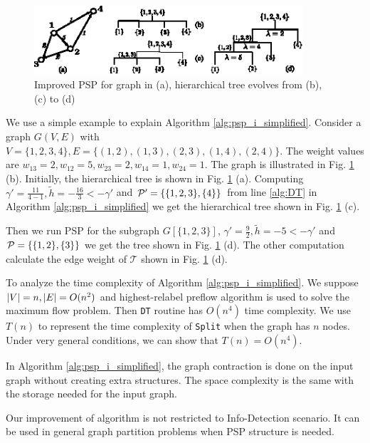 \documentclass[runningheads]{llncs}
\begin{document}
\begin{figure}[!ht]
	\centering
	\includegraphics[width=10cm]{pic/alg_illustration.eps}
	\caption{Improved PSP for graph in (a), hierarchical tree evolves from (b), (c) to (d) }\label{fig:alg_eg}
\end{figure}

\begin{example}
	We use a simple example to explain Algorithm \ref{alg:psp_i_simplified}. Consider a graph $G(V, E)$ with $V=\{1,2,3,4\}, E=\{(1,2),(1,3),(2,3),(1,4),(2,4)\}$. The weight values are $w_{13}=2, w_{12}=5, w_{23}=2, w_{14}=1, w_{24}=1$. The graph is illustrated
	in Fig. \ref{fig:alg_eg} (b). Initially, the hierarchical tree is shown in Fig. \ref{fig:alg_eg} (a). Computing $\gamma' = \frac{11}{4-1}, \tilde{h} = -\frac{16}{3} < -\gamma' $ and $\P' = \{\{1,2,3\},\{4\}\}$ from line \ref {alg:DT} in Algorithm \ref{alg:psp_i_simplified} we get the hierarchical tree shown in Fig. \ref{fig:alg_eg} (c).
	
	Then we run PSP for the subgraph $G[\{1,2,3\}]$, $\gamma' = \frac{9}{2}, \tilde{h} = -5 < -\gamma'$ and $\P= \{\{1,2\},\{3\}\}$ we get the tree shown in Fig. \ref{fig:alg_eg} (d). The other computation calculate the edge weight of $\mathcal{T}$ shown in Fig. \ref{fig:alg_eg} (d).
\end{example}		

To analyze the time complexity of Algorithm \ref{alg:psp_i_simplified}. We suppose $\abs{V} = n, \abs{E} = O(n^2)$ and highest-relabel preflow algorithm is used to solve the maximum flow problem. Then \texttt{DT} routine has $O(n^4)$ time complexity. 
We use $T(n)$ to represent the time complexity of \texttt{Split} when the graph has $n$ nodes. Under very general conditions, we can show that $T(n) = O(n^4)$. 

In Algorithm \ref{alg:psp_i_simplified}, the graph contraction is done on the input graph without creating extra structures. The space complexity is the same with the storage needed for the input graph. 

Our improvement of algorithm is not restricted to Info-Detection scenario. It can be used in general graph partition problems when PSP structure is needed.
\end{document}

